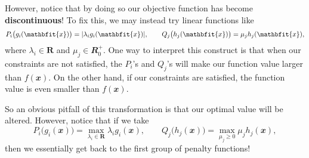 \documentclass[math, code]{amznotes}
\theoremstyle{remark}
\begin{document}
However, notice that by doing so our objective function has become \textbf{discontinuous}! To fix this, we may instead try linear functions like
\begin{equation*}
    P_i\bigl(g_i(\mathbfit{x})\bigr) = \abs{\lambda_ig_i(\mathbfit{x})}, \qquad Q_j\bigl(h_j(\mathbfit{x})\bigr) = \mu_jh_j(\mathbfit{x}),
\end{equation*}
where $\lambda_i \in \mathbf{R}$ and $\mu_j \in \mathbfit{R}^+_0$. One way to interpret this construct is that when our constraints are not satisfied, the $P_i$'s and $Q_j$'s will make our function value larger than $f(\mathbfit{x})$. On the other hand, if our constraints are satisfied, the function value is even smaller than $f(\mathbfit{x})$.

So an obvious pitfall of this transformation is that our optimal value will be altered. However, notice that if we take
\begin{equation*}
    P_i\bigl(g_i(\mathbfit{x})\bigr) = \max_{\lambda_i \in \mathbf{R}}\lambda_ig_i(\mathbfit{x}), \qquad Q_j\bigl(h_j(\mathbfit{x})\bigr) = \max_{\mu_j \geq 0}\mu_jh_j(\mathbfit{x}),
\end{equation*}
then we essentially get back to the first group of penalty functions! 
\end{document}
